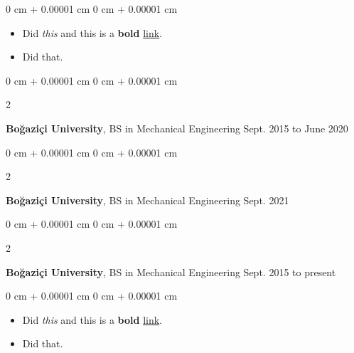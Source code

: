 \documentclass[10pt, letterpaper]{article}
\newenvironment{highlights}{
    \begin{itemize}[
        topsep=0.10 cm,
        parsep=0.10 cm,
        partopsep=0pt,
        itemsep=0pt,
        leftmargin=0 cm + 10pt
    ]
}{
    \end{itemize}
        
    \vspace{-0.10cm}
} %
\newenvironment{onecolentry}{
    \begin{adjustwidth}{
        0 cm + 0.00001 cm
    }{
        0 cm + 0.00001 cm
    }
}{
    \end{adjustwidth}
} %
\newenvironment{twocolentry}[2][]{
    \onecolentry
    \def\secondColumn{#2}
    \setcolumnwidth{\fill, 4.1 cm}
    \begin{paracol}{2}
}{
    \switchcolumn \raggedleft \secondColumn
    \end{paracol}
    \endonecolentry
} %
\begin{document}
        \vspace{0.10 cm}
        \begin{onecolentry}
            \begin{highlights}
                \item Did \textit{this} and this is a \textbf{bold} \href{https://example.com}{link}.
                \item Did that.
            \end{highlights}
        \end{onecolentry}


        \vspace{0.15 cm}

        \begin{twocolentry}{
            Sept. 2015 to June 2020
        }
            \textbf{Boğaziçi University}, BS in Mechanical Engineering\end{twocolentry}

        \vspace{0.10 cm}


        \vspace{0.15 cm}

        \begin{twocolentry}{
            Sept. 2021
        }
            \textbf{Boğaziçi University}, BS in Mechanical Engineering\end{twocolentry}

        \vspace{0.10 cm}


        \vspace{0.15 cm}

        \begin{twocolentry}{
            Sept. 2015 to present
        }
            \textbf{Boğaziçi University}, BS in Mechanical Engineering\end{twocolentry}

        \vspace{0.10 cm}
        \begin{onecolentry}
            \begin{highlights}
                \item Did \textit{this} and this is a \textbf{bold} \href{https://example.com}{link}.
                \item Did that.
            \end{highlights}
        \end{onecolentry}


        \vspace{0.15 cm}
\end{document}
